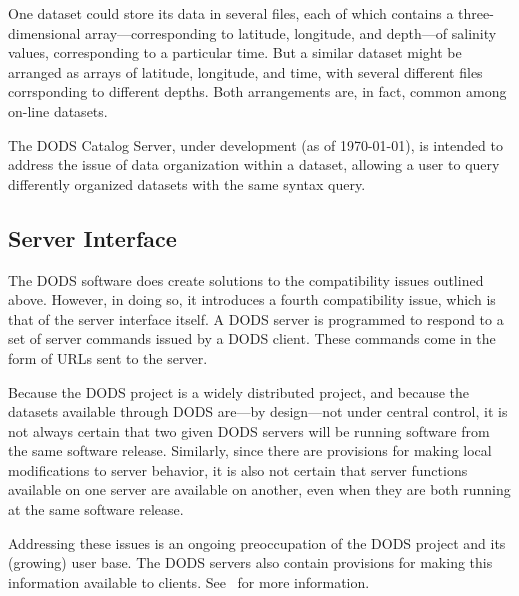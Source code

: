 One dataset could store its data in several files, each of which
contains a three-dimensional array---corresponding to latitude,
longitude, and depth---of salinity values, corresponding to a
particular time.  But a similar dataset might be arranged as arrays of
latitude, longitude, and time, with several different files
corrsponding to different depths.  Both arrangements are, in fact,
common among on-line datasets.

The DODS Catalog Server, under development (as of \today), is intended
to address the issue of data organization within a dataset, allowing a
user to query differently organized datasets with the same syntax
query. 


\subsection{Server Interface}

The DODS software does create solutions to the compatibility issues
outlined above.  However, in doing so, it introduces a fourth
compatibility issue, which is that of the server interface itself.  A
DODS server is programmed to respond to a set of server commands
issued by a DODS client.  These commands come in the form of URLs sent
to the server.

Because the DODS project is a widely distributed project, and because
the datasets available through DODS are---by design---not under
central control, it is not always certain that two given DODS servers
will be running software from the same software release.  Similarly,
since there are provisions for making local modifications to server
behavior, it is also not certain that server functions available on
one server are available on another, even when they are both running
at the same software release.

Addressing these issues is an ongoing preoccupation of the DODS
project and its (growing) user base.  The DODS servers also contain
provisions for making this information available to clients. See
\DODSuser\ for more information.


















